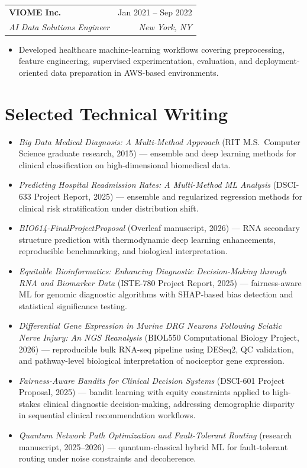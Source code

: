 \documentclass[10pt]{article}
\makeatletter
\newcommand{\entry}[4]{
  \noindent\begin{tabularx}{\textwidth}{@{}Xr@{}}
    \textbf{#1} & #2 \\
    \textit{#3} & \textit{#4}
  \end{tabularx}\vspace{1pt}
}
\makeatother
\begin{document}
\entry{VIOME Inc.}{Jan 2021 -- Sep 2022}{AI Data Solutions Engineer}{New York, NY}
\begin{itemize}
  \item Developed healthcare machine-learning workflows covering preprocessing, feature engineering, supervised experimentation, evaluation, and deployment-oriented data preparation in AWS-based environments.
\end{itemize}

\section{Selected Technical Writing}
\begin{itemize}
  \item \textit{Big Data Medical Diagnosis: A Multi-Method Approach} (RIT M.S.\ Computer Science graduate research, 2015) --- ensemble and deep learning methods for clinical classification on high-dimensional biomedical data.
  \item \textit{Predicting Hospital Readmission Rates: A Multi-Method ML Analysis} (DSCI-633 Project Report, 2025) --- ensemble and regularized regression methods for clinical risk stratification under distribution shift.
  \item \textit{BIO614-FinalProjectProposal} (Overleaf manuscript, 2026) --- RNA secondary structure prediction with thermodynamic deep learning enhancements, reproducible benchmarking, and biological interpretation.
  \item \textit{Equitable Bioinformatics: Enhancing Diagnostic Decision-Making through RNA and Biomarker Data} (ISTE-780 Project Report, 2025) --- fairness-aware ML for genomic diagnostic algorithms with SHAP-based bias detection and statistical significance testing.
  \item \textit{Differential Gene Expression in Murine DRG Neurons Following Sciatic Nerve Injury: An NGS Reanalysis} (BIOL550 Computational Biology Project, 2026) --- reproducible bulk RNA-seq pipeline using DESeq2, QC validation, and pathway-level biological interpretation of nociceptor gene expression.
  \item \textit{Fairness-Aware Bandits for Clinical Decision Systems} (DSCI-601 Project Proposal, 2025) --- bandit learning with equity constraints applied to high-stakes clinical diagnostic decision-making, addressing demographic disparity in sequential clinical recommendation workflows.
  \item \textit{Quantum Network Path Optimization and Fault-Tolerant Routing} (research manuscript, 2025--2026) --- quantum-classical hybrid ML for fault-tolerant routing under noise constraints and decoherence.
\end{itemize}
\end{document}
